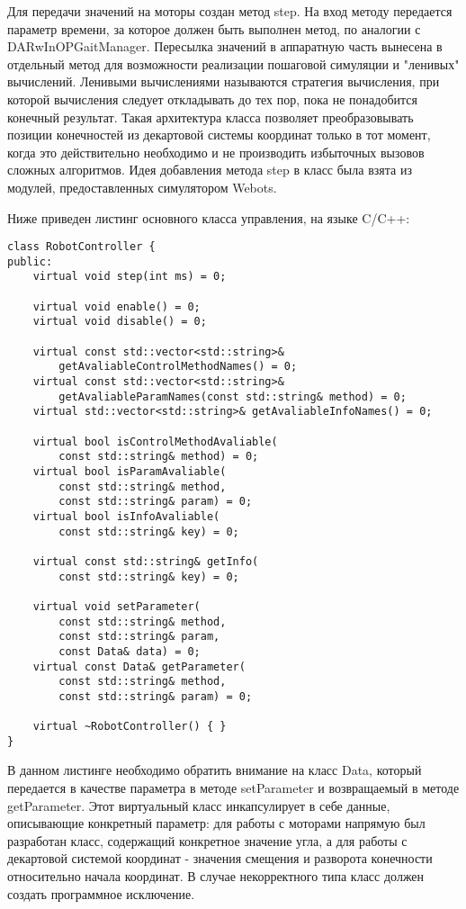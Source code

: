 
Для передачи значений на моторы создан метод step. На вход методу передается параметр времени, за которое должен быть выполнен метод, по аналогии с DARwInOPGaitManager. Пересылка значений в аппаратную часть вынесена в отдельный метод для возможности реализации пошаговой симуляции и "ленивых" вычислений. Ленивыми вычислениями называются стратегия вычисления, при которой вычисления следует откладывать до тех пор, пока не понадобится конечный результат. Такая архитектура класса позволяет преобразовывать позиции конечностей из декартовой системы координат только в тот момент, когда это действительно необходимо и не производить избыточных вызовов сложных алгоритмов. Идея добавления метода step в класс была взята из модулей, предоставленных симулятором Webots.

Ниже приведен листинг основного класса управления, на языке C/C++:

\lstset{language=C++}
\begin{lstlisting}
class RobotController {
public:
    virtual void step(int ms) = 0;

    virtual void enable() = 0;
    virtual void disable() = 0;

    virtual const std::vector<std::string>&
        getAvaliableControlMethodNames() = 0;
    virtual const std::vector<std::string>&
        getAvaliableParamNames(const std::string& method) = 0;
    virtual std::vector<std::string>& getAvaliableInfoNames() = 0;
    
    virtual bool isControlMethodAvaliable(
        const std::string& method) = 0;
    virtual bool isParamAvaliable(
        const std::string& method,
        const std::string& param) = 0;
    virtual bool isInfoAvaliable(
        const std::string& key) = 0;
    
    virtual const std::string& getInfo(
        const std::string& key) = 0;
        
    virtual void setParameter(
        const std::string& method,
        const std::string& param,
        const Data& data) = 0;
    virtual const Data& getParameter(
        const std::string& method,
        const std::string& param) = 0;
    
    virtual ~RobotController() { }
}
\end{lstlisting}

В данном листинге необходимо обратить внимание на класс Data, который передается в качестве параметра в методе setParameter и возвращаемый в методе getParameter. Этот виртуальный класс инкапсулирует в себе данные, описывающие конкретный параметр: для работы с моторами напрямую был разработан класс, содержащий конкретное значение угла, а для работы с декартовой системой координат - значения смещения и разворота конечности относительно начала координат. В случае некорректного типа класс должен создать программное исключение.

